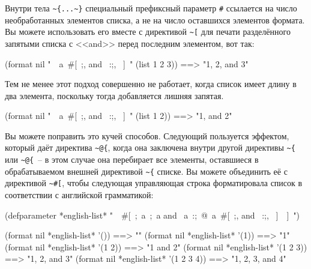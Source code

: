 Внутри тела \lstinline!~{...~}! специальный префиксный параметр \lstinline!#! ссылается на число необработанных элементов списка, а
не на число оставшихся элементов формата. Вы можете использовать его вместе с директивой \lstinline!~[! для печати
разделённого запятыми списка с <<and>> перед последним элементом, вот так:

\begin{myverb}
(format nil "~{~a~#[~;, and ~:;, ~]~}" (list 1 2 3)) ==> "1, 2, and 3"
\end{myverb}

Тем не менее этот подход совершенно не работает, когда список имеет длину в два элемента,
поскольку тогда добавляется лишняя запятая.

\begin{myverb}
(format nil "~{~a~#[~;, and ~:;, ~]~}" (list 1 2)) ==> "1, and 2"
\end{myverb}

Вы можете поправить это кучей способов. Следующий пользуется эффектом, который даёт директива \lstinline!~@{!, когда она
заключена внутри другой директивы \lstinline!~{! или \lstinline!~@{!~-- в этом случае она перебирает все элементы, оставшиеся в
обрабатываемом внешней директивой \lstinline!~{! списке. Вы можете объединить её с директивой \lstinline!~#[!, чтобы следующая
управляющая строка форматировала список в соответствии с английской грамматикой:

\begin{myverb}
(defparameter *english-list*
  "~{~#[~;~a~;~a and ~a~:;~@{~a~#[~;, and ~:;, ~]~}~]~}")

(format nil *english-list* '())        ==> ""
(format nil *english-list* '(1))       ==> "1"
(format nil *english-list* '(1 2))     ==> "1 and 2"
(format nil *english-list* '(1 2 3))   ==> "1, 2, and 3"
(format nil *english-list* '(1 2 3 4)) ==> "1, 2, 3, and 4"
\end{myverb}

